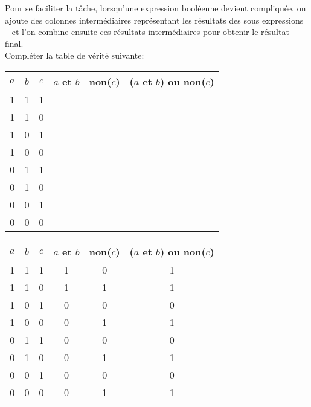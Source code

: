 \documentclass[12pt]{article}
\begin{document}
	\begin{MonExo}
		Pour se faciliter la tâche, lorsqu'une expression booléenne devient compliquée, on ajoute des colonnes intermédiaires représentant les résultats des sous expressions -- et l'on combine ensuite ces résultats intermédiaires pour obtenir le résultat final.
		\\
		
		Compléter la table de vérité suivante:
		\\
		
		\begin{center}
					
			\begin{tabular}{|c|c|c|c|c|c|}
				\hline
				$a$ & $b$ & $c$ & $a$ et $b$ & non($c$) & ($a$ et $b$) ou non($c$)\\ \hline
				1 & 1 & 1 &  &  &  \\ \hline
				1 & 1 & 0 &  &  &  \\ \hline
				1 & 0 & 1 & & & \\ \hline
				1 & 0 & 0 & & & \\ \hline
				0 & 1 & 1 &  &  &  \\ \hline
				0 & 1 & 0 &  &  &  \\ \hline
				0 & 0 & 1 & & & \\ \hline
				0 & 0 & 0 & & & \\ \hline
			\end{tabular}
		\end{center}
	\end{MonExo}
	\begin{MaReponse}
		\begin{center}		
			\begin{tabular}{|c|c|c|c|c|c|}
				\hline
				$a$ & $b$ & $c$ & $a$ et $b$ & non($c$) & ($a$ et $b$) ou non($c$)\\ \hline
				1 & 1 & 1 & 1 & 0 & 1 \\ \hline
				1 & 1 & 0 & 1 & 1 & 1 \\ \hline
				1 & 0 & 1 & 0 & 0 & 0 \\ \hline
				1 & 0 & 0 & 0 & 1 & 1 \\ \hline
				0 & 1 & 1 & 0 & 0 & 0 \\ \hline
				0 & 1 & 0 & 0 & 1 & 1 \\ \hline
				0 & 0 & 1 & 0 & 0 & 0 \\ \hline
				0 & 0 & 0 & 0 & 1 & 1 \\ \hline
			\end{tabular}
		\end{center}
	\end{MaReponse}
	
\end{document}
